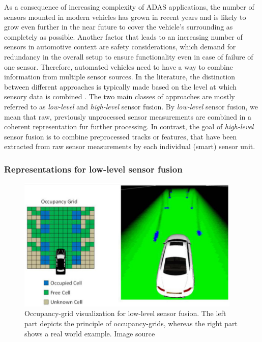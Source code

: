 As a consequence of increasing complexity of \ac{ADAS} applications, the number of sensors mounted in modern vehicles has grown in recent years and is likely to grow even further in the near future to cover the vehicle's surrounding as completely as possible.
Another factor that leads to an increasing number of sensors in automotive context are safety considerations, which demand for redundancy in the overall setup to ensure functionality even in case of failure of one sensor.
Therefore, automated vehicles need to have a way to combine information from multiple sensor sources.
In the literature, the distinction between different approaches is typically made based on the level at which sensory data is combined \cite{Elfring2016}.
The two main classes of approaches are mostly referred to as \emph{low-level} and \emph{high-level} sensor fusion.
By \emph{low-level} sensor fusion, we mean that raw, previously unprocessed sensor measurements are combined in a coherent representation fur further processing.
In contrast, the goal of \emph{high-level} sensor fusion is to combine preprocessed tracks or features, that have been extracted from raw sensor measurements by each individual (smart) sensor unit.

\subsubsection{Representations for low-level sensor fusion}
\begin{figure}[t!]
	\centering
	\includegraphics[width=0.95\textwidth]{imgs/occupancy_grid_principle.png}
    \caption{Occupancy-grid visualization for low-level sensor fusion. The left part depicts the principle of occupancy-grids, whereas the right part shows a real world example. Image source \cite{Hohm2014}}
	\label{fig:occupancy-grid}
\end{figure}

